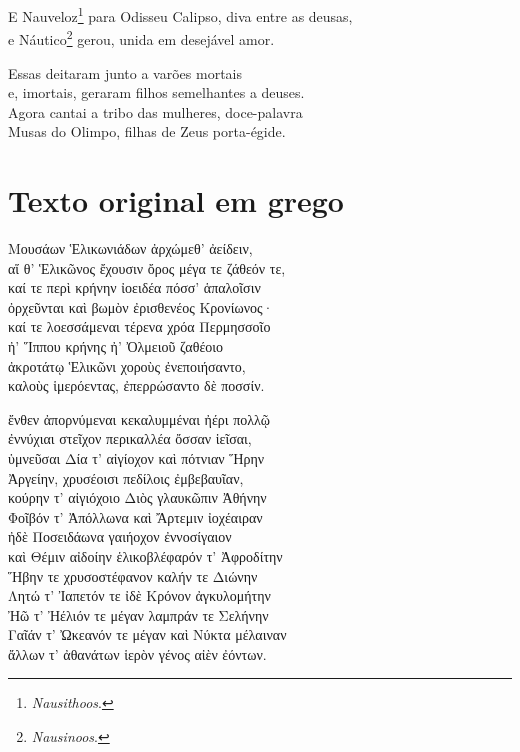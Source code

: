 \quad{}E Nauveloz\footnote{\emph{Nausithoos}.} para Odisseu Calipso, diva entre as deusas,\\
e Náutico\footnote{\emph{Nausinoos}.} gerou, unida em desejável amor.

\quad{}Essas deitaram junto a varões mortais\\
e, imortais, geraram filhos semelhantes a deuses. \\
Agora cantai a tribo das mulheres, doce-palavra\\
Musas do Olimpo, filhas de Zeus porta-égide.


\chapter{Texto original em grego}

Μουσάων Ἑλικωνιάδων ἀρχώμεθ' ἀείδειν,\\
αἵ θ' Ἑλικῶνος ἔχουσιν ὄρος μέγα τε ζάθεόν τε, \\
καί τε περὶ κρήνην ἰοειδέα πόσσ' ἁπαλοῖσιν\\
ὀρχεῦνται καὶ βωμὸν ἐρισθενέος Κρονίωνος·\\
καί τε λοεσσάμεναι τέρενα χρόα Περμησσοῖο \\
ἠ' Ἵππου κρήνης ἠ' Ὀλμειοῦ ζαθέοιο\\
ἀκροτάτῳ Ἑλικῶνι χοροὺς ἐνεποιήσαντο,\\
καλοὺς ἱμερόεντας, ἐπερρώσαντο δὲ ποσσίν.

\quad{}ἔνθεν ἀπορνύμεναι κεκαλυμμέναι ἠέρι πολλῷ \\
ἐννύχιαι στεῖχον περικαλλέα ὄσσαν ἱεῖσαι, \\
ὑμνεῦσαι Δία τ' αἰγίοχον καὶ πότνιαν Ἥρην\\
Ἀργείην, χρυσέοισι πεδίλοις ἐμβεβαυῖαν, \\
κούρην τ' αἰγιόχοιο Διὸς γλαυκῶπιν Ἀθήνην\\
Φοῖβόν τ' Ἀπόλλωνα καὶ Ἄρτεμιν ἰοχέαιραν\\
ἠδὲ Ποσειδάωνα γαιήοχον ἐννοσίγαιον \\
καὶ Θέμιν αἰδοίην ἑλικοβλέφαρόν τ' Ἀφροδίτην\\
Ἥβην τε χρυσοστέφανον καλήν τε Διώνην\\
Λητώ τ' Ἰαπετόν τε ἰδὲ Κρόνον ἀγκυλομήτην\\
Ἠῶ τ' Ἠέλιόν τε μέγαν λαμπράν τε Σελήνην\\
Γαῖάν τ' Ὠκεανόν τε μέγαν καὶ Νύκτα μέλαιναν \\
ἄλλων τ' ἀθανάτων ἱερὸν γένος αἰὲν ἐόντων.

